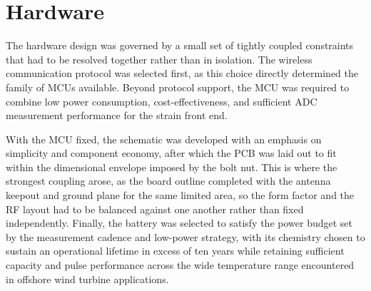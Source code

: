 \chapter{Hardware} \label{sec:Hardware}
 
The hardware design was governed by a small set of tightly coupled constraints that had to be resolved together rather than in isolation. The wireless communication protocol was selected first, as this choice directly determined the family of MCUs available. Beyond protocol support, the MCU was required to combine low power consumption, cost-effectiveness, and sufficient ADC measurement performance for the strain front end.
 
With the MCU fixed, the schematic was developed with an emphasis on simplicity and component economy, after which the PCB was laid out to fit within the dimensional envelope imposed by the bolt nut. This is where the strongest coupling arose, as the board outline completed with the antenna keepout and ground plane for the same limited area, so the form factor and the RF layout had to be balanced against one another rather than fixed independently. Finally, the battery was selected to satisfy the power budget set by the measurement cadence and low-power strategy, with its chemistry chosen to sustain an operational lifetime in excess of ten years while retaining sufficient capacity and pulse performance across the wide temperature range encountered in offshore wind turbine applications.